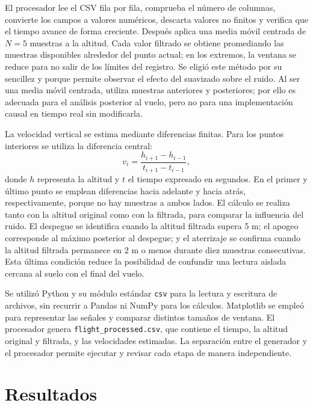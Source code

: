 \documentclass[9pt,a4paper]{extarticle}
\begin{document}
El procesador lee el CSV fila por fila, comprueba el número de columnas, convierte los campos a valores numéricos, descarta valores no finitos y verifica que el tiempo avance de forma creciente. Después aplica una media móvil centrada de \(N=5\) muestras a la altitud. Cada valor filtrado se obtiene promediando las muestras disponibles alrededor del punto actual; en los extremos, la ventana se reduce para no salir de los límites del registro. Se eligió este método por su sencillez y porque permite observar el efecto del suavizado sobre el ruido. Al ser una media móvil centrada, utiliza muestras anteriores y posteriores; por ello es adecuada para el análisis posterior al vuelo, pero no para una implementación causal en tiempo real sin modificarla.

La velocidad vertical se estima mediante diferencias finitas. Para los puntos interiores se utiliza la diferencia central:
\begin{equation}
v_i=\frac{h_{i+1}-h_{i-1}}{t_{i+1}-t_{i-1}},
\label{eq:velocidad}
\end{equation}
donde \(h\) representa la altitud y \(t\) el tiempo expresado en segundos. En el primer y último punto se emplean diferencias hacia adelante y hacia atrás, respectivamente, porque no hay muestras a ambos lados. El cálculo se realiza tanto con la altitud original como con la filtrada, para comparar la influencia del ruido. El despegue se identifica cuando la altitud filtrada supera 5 m; el apogeo corresponde al máximo posterior al despegue; y el aterrizaje se confirma cuando la altitud filtrada permanece en 2 m o menos durante diez muestras consecutivas. Esta última condición reduce la posibilidad de confundir una lectura aislada cercana al suelo con el final del vuelo.

Se utilizó Python y su módulo estándar \texttt{csv} para la lectura y escritura de archivos, sin recurrir a Pandas ni NumPy para los cálculos. Matplotlib se empleó para representar las señales y comparar distintos tamaños de ventana. El procesador genera \texttt{flight\_processed.csv}, que contiene el tiempo, la altitud original y filtrada, y las velocidades estimadas. La separación entre el generador y el procesador permite ejecutar y revisar cada etapa de manera independiente.

\newpage
\section{Resultados}
\end{document}
